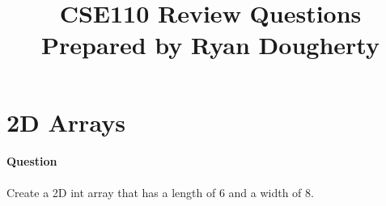 \documentclass{article}
\date{}
\begin{document}
\title{\textbf{CSE110 Review Questions \\
Prepared by Ryan Dougherty}}
\maketitle

\section*{2D Arrays}


\setcounter{question_num}{1}
\paragraph{Question }
Create a 2D int array that has a length of 6 and a width of 8.
\end{document}
